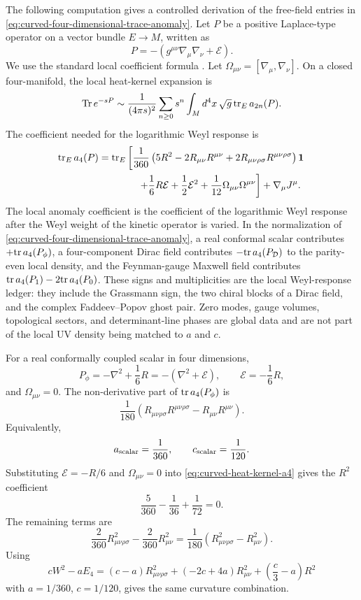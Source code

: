 The following computation gives a controlled derivation of the free-field
entries in \eqref{eq:curved-four-dimensional-trace-anomaly}.  Let \(P\) be a
positive Laplace-type operator on a vector bundle \(E\to M\), written as
\[
  P=-(g^{\mu\nu}\nabla_\mu\nabla_\nu+\mathcal E).
\]
We use the standard local coefficient formula
\cite{Seeley1967,Gilkey1984}.
Let \(\Omega_{\mu\nu}=[\nabla_\mu,\nabla_\nu]\).  On a closed four-manifold,
the local heat-kernel expansion is
\[
  {\rm Tr}\,e^{-sP}
  \sim
  \frac{1}{(4\pi s)^2}
  \sum_{n\ge0}s^n
  \int_M d^4x\,\sqrt g\,
  {\rm tr}_E\,a_{2n}(P).
\]
The coefficient needed for the logarithmic Weyl response is
\begin{align}
  {\rm tr}_E\,a_4(P)
  &=
  {\rm tr}_E\left[
  \frac{1}{360}
  \left(
  5R^2-2R_{\mu\nu}R^{\mu\nu}
  +2R_{\mu\nu\rho\sigma}R^{\mu\nu\rho\sigma}
  \right)\mathbf 1
  \right.
  \notag\\
  &\hspace{4em}\left.
  +\frac16R\mathcal E+\frac12\mathcal E^2
  +\frac1{12}\Omega_{\mu\nu}\Omega^{\mu\nu}
  \right]
  +\nabla_\mu J^\mu .
  \label{eq:curved-heat-kernel-a4}
\end{align}
The local anomaly coefficient is the coefficient of the logarithmic Weyl
response after the Weyl weight of the kinetic operator is varied.  In the
normalization of \eqref{eq:curved-four-dimensional-trace-anomaly}, a real
conformal scalar contributes \(+{\rm tr}\,a_4(P_\phi)\), a four-component
Dirac field contributes \(-{\rm tr}\,a_4(P_{\mathcal D})\) to the
parity-even local density, and the Feynman-gauge Maxwell field contributes
\({\rm tr}\,a_4(P_1)-2{\rm tr}\,a_4(P_0)\).  These signs and multiplicities
are the local Weyl-response ledger: they include the Grassmann sign, the
two chiral blocks of a Dirac field, and the complex Faddeev--Popov ghost
pair.  Zero modes, gauge volumes, topological sectors, and determinant-line
phases are global data and are not part of the local UV density being matched
to \(a\) and \(c\).

For a real conformally coupled scalar in four dimensions,
\[
  P_\phi=-\nabla^2+\frac16R
  =
  -(\nabla^2+\mathcal E),
  \qquad
  \mathcal E=-\frac16R,
\]
and \(\Omega_{\mu\nu}=0\).  The non-derivative part of
\({\rm tr}\,a_4(P_\phi)\) is
\[
  \frac{1}{180}
  \left(
  R_{\mu\nu\rho\sigma}R^{\mu\nu\rho\sigma}
  -
  R_{\mu\nu}R^{\mu\nu}
  \right).
\]
Equivalently,
\[
  a_{\rm scalar}=\frac1{360},
  \qquad
  c_{\rm scalar}=\frac1{120}.
\]
Substituting \(\mathcal E=-R/6\) and \(\Omega_{\mu\nu}=0\) into
\eqref{eq:curved-heat-kernel-a4} gives the \(R^2\) coefficient
\[
  \frac{5}{360}-\frac{1}{36}+\frac{1}{72}=0.
\]
The remaining terms are
\[
  \frac{2}{360}R_{\mu\nu\rho\sigma}^2
  -
  \frac{2}{360}R_{\mu\nu}^2
  =
  \frac1{180}(R_{\mu\nu\rho\sigma}^2-R_{\mu\nu}^2).
\]
Using
\[
  cW^2-aE_4
  =
  (c-a)R_{\mu\nu\rho\sigma}^2
  +(-2c+4a)R_{\mu\nu}^2
  +\left(\frac c3-a\right)R^2
\]
with \(a=1/360\), \(c=1/120\), gives the same curvature combination.

